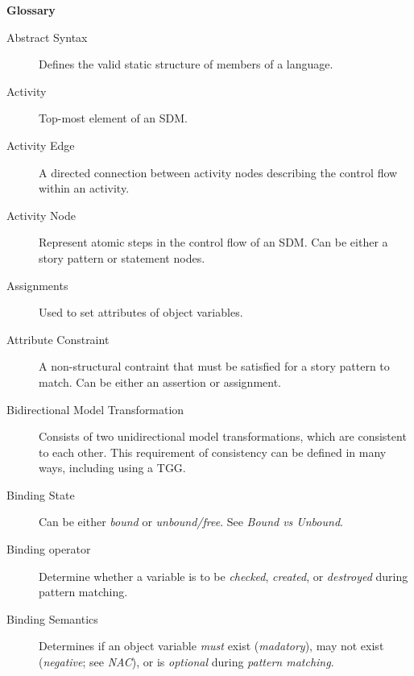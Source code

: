 \newpage
{}
{}
\hypertarget{glossary}{}
\genHeader

\vspace{1cm}
{\Huge \bf Glossary}
\vspace{1cm}

\normalsize{}


\begin{description}

\item[Abstract Syntax] %
Defines the valid static structure of members of a language. 

\item[Activity] %
Top-most element of an SDM.

\item[Activity Edge] %
A directed connection between activity nodes describing the control flow within an activity.

\item[Activity Node] %
Represent atomic steps in the control flow of an SDM. Can be either a story pattern or statement nodes.

\item[Assignments] %
Used to set attributes of object variables.

\item[Attribute Constraint] %
A non-structural contraint that must be satisfied for a story pattern to match. Can be either an assertion or assignment.

\item[Bidirectional Model Transformation] %
Consists of two unidirectional model transformations, which are consistent to each other. This requirement of
consistency can be defined in many ways, including using a TGG.

\item[Binding State] %
Can be either \emph{bound} or \emph{unbound/free}. See \emph{Bound vs Unbound}.

\item[Binding operator] %
Determine whether a variable is to be \emph{checked}, \emph{created}, or \emph{destroyed} during pattern matching.

\item[Binding Semantics] %
Determines if an object variable \emph{must} exist (\emph{madatory}), may not exist (\emph{negative}; see \emph{NAC}), or is \emph{optional} during
\emph{pattern matching}.


\end{description}
